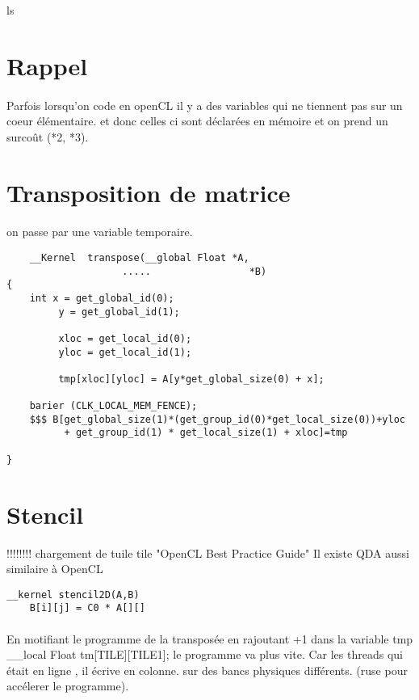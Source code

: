 ls\documentclass{article}
\begin{document}

\section{Rappel}
\paragraph{}
Parfois lorsqu'on code en openCL il y a des variables qui ne tiennent pas sur un coeur élémentaire. et donc celles ci sont déclarées en mémoire et on prend un surcoût (*2, *3). 

\section{Transposition de matrice}
\paragraph{}
 on passe par une variable temporaire.

\begin{verbatim}
	__Kernel  transpose(__global Float *A,
					.....                 *B)
{
	int x = get_global_id(0);
	     y = get_global_id(1);

	     xloc = get_local_id(0);
	     yloc = get_local_id(1);

	     tmp[xloc][yloc] = A[y*get_global_size(0) + x];
	
	barier (CLK_LOCAL_MEM_FENCE);
	$$$ B[get_global_size(1)*(get_group_id(0)*get_local_size(0))+yloc	
	      + get_group_id(1)	* get_local_size(1) + xloc]=tmp

}
\end{verbatim}

\section{Stencil}
!!!!!!!! chargement de tuile
	tile  "OpenCL Best Practice Guide" 
Il existe QDA aussi similaire à OpenCL

\begin{verbatim}
__kernel stencil2D(A,B)
	B[i][j] = C0 * A[][]
\end{verbatim}

\paragraph{}
En motifiant le programme de la transposée en rajoutant +1 dans la variable tmp
__local Float tm[TILE][TILE1];
le programme va plus vite. 
Car les threads qui était en ligne , il écrive en colonne. sur des bancs physiques différents. 
(ruse pour accélerer le programme).
\end{document}
